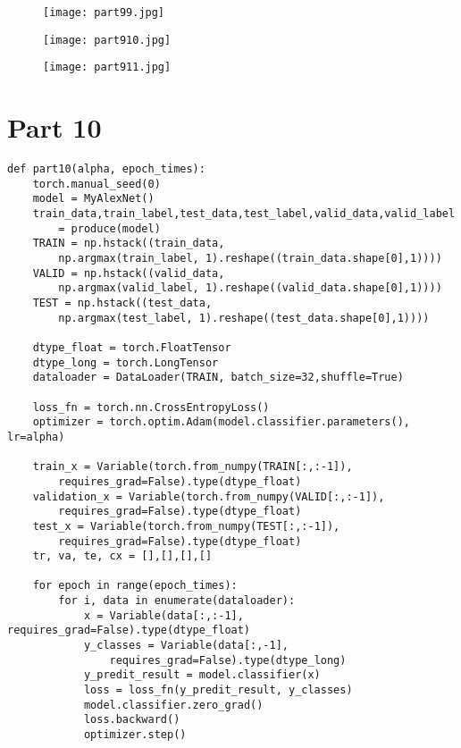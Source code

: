 \documentclass{article}
\begin{document}
\begin{figure}[!htb]
  \texttt{[image: part99.jpg]}
  \caption*{}\label{fig:2}
\endminipage\hfill
{}
  \texttt{[image: part910.jpg]}
  \caption*{}\label{fig:2}
\endminipage\hfill
{}
  \texttt{[image: part911.jpg]}
  \caption*{}\label{fig:100}
\endminipage
\end{figure}

\vspace{250px}
\section*{Part 10}
\Large\begin{lstlisting}[basicstyle=\large\ttfamily]
def part10(alpha, epoch_times):    
    torch.manual_seed(0)
    model = MyAlexNet()
    train_data,train_label,test_data,test_label,valid_data,valid_label 
        = produce(model)
    TRAIN = np.hstack((train_data,
        np.argmax(train_label, 1).reshape((train_data.shape[0],1))))
    VALID = np.hstack((valid_data,
        np.argmax(valid_label, 1).reshape((valid_data.shape[0],1))))
    TEST = np.hstack((test_data,
        np.argmax(test_label, 1).reshape((test_data.shape[0],1))))
    
    dtype_float = torch.FloatTensor
    dtype_long = torch.LongTensor
    dataloader = DataLoader(TRAIN, batch_size=32,shuffle=True)
    
    loss_fn = torch.nn.CrossEntropyLoss()
    optimizer = torch.optim.Adam(model.classifier.parameters(), lr=alpha)
    
    train_x = Variable(torch.from_numpy(TRAIN[:,:-1]),
        requires_grad=False).type(dtype_float)
    validation_x = Variable(torch.from_numpy(VALID[:,:-1]),
        requires_grad=False).type(dtype_float)
    test_x = Variable(torch.from_numpy(TEST[:,:-1]),
        requires_grad=False).type(dtype_float)
    tr, va, te, cx = [],[],[],[]
    
    for epoch in range(epoch_times):
        for i, data in enumerate(dataloader):
            x = Variable(data[:,:-1], requires_grad=False).type(dtype_float)
            y_classes = Variable(data[:,-1],
                requires_grad=False).type(dtype_long)
            y_predit_result = model.classifier(x)
            loss = loss_fn(y_predit_result, y_classes)
            model.classifier.zero_grad()
            loss.backward()
            optimizer.step()
        

\end{lstlisting}
\end{document}
